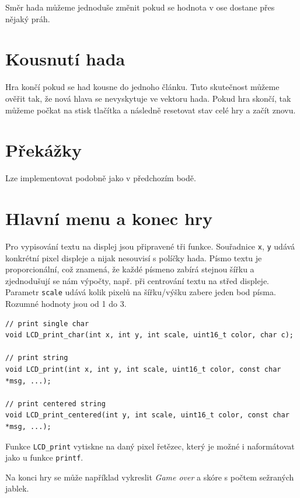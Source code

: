\documentclass[12pt]{article}
\begin{document}
Směr hada můžeme jednoduše změnit pokud se hodnota v ose dostane přes nějaký práh.

\section{Kousnutí hada}
Hra končí pokud se had kousne do jednoho článku.
Tuto skutečnost můžeme ověřit tak, že nová hlava se nevyskytuje ve vektoru hada.
Pokud hra skončí, tak můžeme počkat na stisk tlačítka a následně resetovat stav celé hry a začít znovu.

\section{Překážky}
Lze implementovat podobně jako v předchozím bodě.

\section{Hlavní menu a konec hry}
Pro vypisování textu na displej jsou připravené tři funkce.
Souřadnice \texttt{x}, \texttt{y} udává konkrétní pixel displeje a nijak nesouvisí s políčky hada.
Písmo textu je proporcionální, což znamená, že každé písmeno zabírá stejnou šířku a zjednodušují se nám výpočty, např. při centrování textu na střed displeje.
Parametr \texttt{scale} udává kolik pixelů na šířku/výšku zabere jeden bod písma.
Rozumné hodnoty jsou od 1 do 3.


\begin{verbatim}
// print single char
void LCD_print_char(int x, int y, int scale, uint16_t color, char c);

// print string
void LCD_print(int x, int y, int scale, uint16_t color, const char *msg, ...);

// print centered string
void LCD_print_centered(int y, int scale, uint16_t color, const char *msg, ...);
\end{verbatim}

Funkce \texttt{LCD\_print} vytiskne na daný pixel řetězec, který je možné i naformátovat jako u funkce \texttt{printf}.

Na konci hry se může například vykreslit \textit{Game over} a skóre s počtem sežraných jablek.
\end{document}
